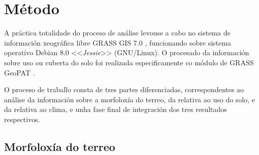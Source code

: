 \documentclass[11pt,a4paper]{article}
\begin{document}





\section{Método}

A práctica totalidade do proceso de análise levouse a cabo no sistema de información xeográfica libre GRASS GIS 7.0 \citep{GRASS7}, funcionando sobre sistema operativo Debian 8.0 <<\emph{Jessie}>> (GNU/Linux). O procesado da información sobre uso ou cuberta do solo foi realizada especificamente co módulo de GRASS GeoPAT \citep[\emph{Geospatial Pattern Analysis Toolbox},][]{Jasiewicz201562}.%

O proceso de traballo consta de tres partes diferenciadas, correspondentes ao análise da información sobre a morfoloxía do terreo, da relativa ao uso do solo, e da relativa ao clima, e unha fase final de integración dos tres resultados respectivos.

\subsection{Morfoloxía do terreo}
\end{document}
